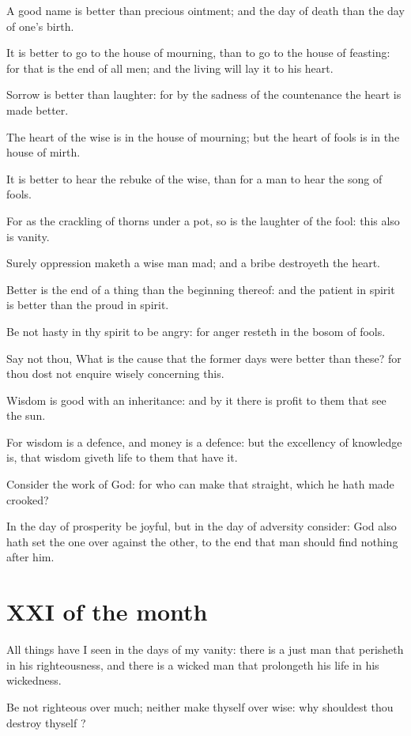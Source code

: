 \documentclass[0main.tex]{subfiles}
\begin{document}
A good name is better than precious ointment; and the day of death than the day of one's birth.

It is better to go to the house of mourning, than to go to the house of feasting: for that is the end of all men; and the living will lay it to his heart.

Sorrow is better than laughter: for by the sadness of the countenance the heart is made better.

The heart of the wise is in the house of mourning; but the heart of fools is in the house of mirth.

It is better to hear the rebuke of the wise, than for a man to hear the song of fools.

For as the crackling of thorns under a pot, so is the laughter of the fool: this also is vanity.

Surely oppression maketh a wise man mad; and a bribe destroyeth the heart.

Better is the end of a thing than the beginning thereof: and the patient in spirit is better than the proud in spirit.

Be not hasty in thy spirit to be angry: for anger resteth in the bosom of fools.

Say not thou, What is the cause that the former days were better than these? for thou dost not enquire wisely concerning this.

Wisdom is good with an inheritance: and by it there is profit to them that see the sun.

For wisdom is a defence, and money is a defence: but the excellency of knowledge is, that wisdom giveth life to them that have it.

Consider the work of God: for who can make that straight, which he hath made crooked?

In the day of prosperity be joyful, but in the day of adversity consider: God also hath set the one over against the other, to the end that man should find nothing after him.

\section*{XXI of the month}

All things have I seen in the days of my vanity: there is a just man that perisheth in his righteousness, and there is a wicked man that prolongeth his life in his wickedness.

Be not righteous over much; neither make thyself over wise: why shouldest thou destroy thyself ?
\end{document}
